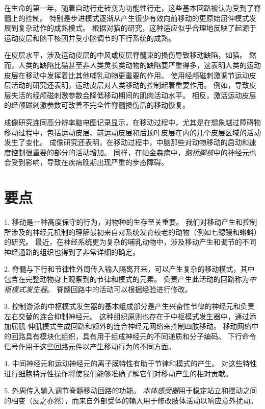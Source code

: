 在生命的第一年，随着自动行走转变为功能性行走，这些基本回路被认为受到了脊髓上的控制。
特别是步进模式逐渐从产生很少有效向前移动的更原始屈伸模式发展到复杂动作的成熟模式。
根据对猫的研究，这种适应似乎合理地反映了起源于运动皮层和脑干核团并受小脑调节的下行系统的成熟。


在皮层水平，涉及运动皮层的中风或皮层脊髓束的损伤导致移动缺陷，如猫。
然而，人类的缺陷比猫甚至非人类灵长类动物的缺陷要严重得多，这表明人类的运动皮层在移动中发挥着比其他哺乳动物更重要的作用。
使用经颅磁刺激调节运动皮层活动的研究还表明，运动皮层对人类移动的控制起着重要作用。
例如，导致皮层失活的经颅磁刺激参数会降低移动期间的肌肉活动水平。
相反，激活运动皮层的经颅磁刺激参数可改善不完全性脊髓损伤后的移动恢复。


成像研究连同高分辨率脑电图记录显示，在移动过程中，尤其是在想象越过障碍物移动过程中，包括运动皮层、前运动皮层和后顶叶皮层在内的几个皮层区域的活动发生了变化。
成像研究还表明，在移动过程中，中脑那些对动物移动的启动和速度控制很重要的部分的活动增加。
同样，在帕金森病中，\textit{脑桥脚核}中的神经元也会受到影响，导致在疾病晚期出现严重的步态障碍。



\section{要点}

1. 移动是一种高度保守的行为，对物种的生存至关重要。
我们对移动产生和控制所涉及的神经元机制的理解最初来自对系统发育较老的动物（例如七鳃鳗和蝌蚪）的研究。
最近，在神经系统更为复杂的哺乳动物中，涉及移动产生和调节的不同神经通路的组织也得到了非常详细的确定。 


2. 脊髓与下行和节律性外周传入输入隔离开来，可以产生复杂的移动模式，其中包含在完整动物身上观察到的节律和模式的元素。
负责产生此活动的回路称为\textit{中枢模式发生器}。
脊髓回路中的活动可以根据经验进行修改。


3. 控制游泳的中枢模式发生器的基本组成部分是产生兴奋性节律的神经元和负责左右交替的连合抑制神经元。
这种组织原则也存在于中枢模式发生器中，通过添加屈肌-伸肌模式生成回路和额外的连合神经元网络来控制四肢移动。
移动网络中的回路具有模块化组织，具有用于组成神经元的不同递质和分子编码。
下行命令信号作用于这些回路元件以产生移动行为的不同方面。


4. 中间神经元和运动神经元的离子膜特性有助于节律和模式的产生。
对这些特性进行细胞特异性操作将使我们能够准确了解它们对移动产生的相对贡献。


5. 外周传入输入调节脊髓移动回路的功能。
\textit{本体感受器}用于稳定站立和摆动之间的相变（反之亦然），而来自外部受体的输入用于修改肢体活动以响应意外扰动。


